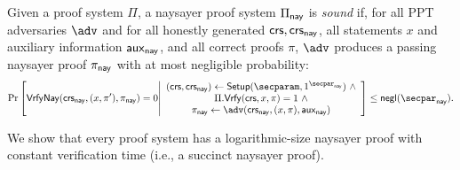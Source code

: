 \begin{definition} Given a proof system $\Pi$, a naysayer proof system $\Pi_{\mathsf{nay}}$ is \emph{sound} if, for all PPT adversaries $\adv$ and for all honestly generated $\mathsf{crs}, \mathsf{crs}_{\mathsf{nay}}$, all statements $x$ and auxiliary information $\mathsf{aux}_{\mathsf{nay}}$, and all correct proofs $\pi$, $\adv$ produces a passing naysayer proof $\pi_{\mathsf{nay}}$ with at most negligible probability:
\begin{equation*}
    \Pr\left[
        \vrfynay(\crs_{\nay}, (x,\pi'), \pi_{\nay})=0 
        \middle| 
        \begin{array}{c}
            (\crs, \crs_{\nay}) \gets \setup(\secparam, 1^{\naysecparam})~\land\\
            \Pi.\vrfy(\crs, x,\pi)=1~\land\\
            \pi_{\nay} \gets \adv(\crs_{\nay}, (x, \pi), \aux_{\nay})
        \end{array}
    \right] \leq\mathsf{negl}(\naysecparam).
\end{equation*}
\end{definition}

  

We show that every proof system has a logarithmic-size naysayer proof with constant verification time (i.e., a succinct naysayer proof). %

